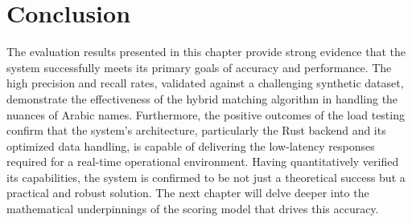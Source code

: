 \section{Conclusion}
The evaluation results presented in this chapter provide strong evidence that the system successfully meets its primary goals of accuracy and performance. The high precision and recall rates, validated against a challenging synthetic dataset, demonstrate the effectiveness of the hybrid matching algorithm in handling the nuances of Arabic names. Furthermore, the positive outcomes of the load testing confirm that the system's architecture, particularly the Rust backend and its optimized data handling, is capable of delivering the low-latency responses required for a real-time operational environment. Having quantitatively verified its capabilities, the system is confirmed to be not just a theoretical success but a practical and robust solution. The next chapter will delve deeper into the mathematical underpinnings of the scoring model that drives this accuracy.